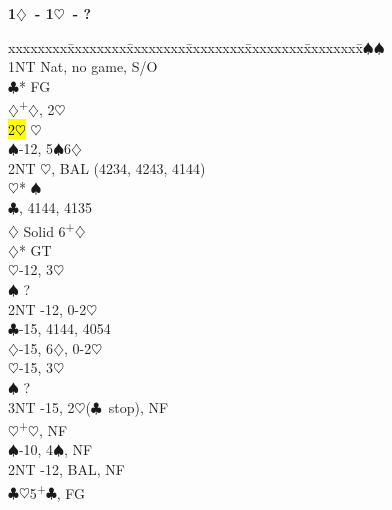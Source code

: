 \documentclass[10pt]{article}
\renewcommand{\c}{$\clubsuit$}
\renewcommand{\d}{$\diamondsuit$}
\newcommand{\h}{$\heartsuit$}
\newcommand{\s}{$\spadesuit$}
\newcommand{\p}{\textsuperscript{+}}
\newcommand{\m}{\textsuperscript{\textminus}}
\newenvironment{bidtable}[1][]
{\textbf{#1}
  \begin{adjustwidth}{1em}{}
    \addvspace{2pt}
    \begin{tabbing}
      xxxxxxxx\=xxxxxxxx\=xxxxxxxx\=xxxxxxxx\=xxxxxxxx\=xxxxxxxx\=\kill}
{\end{tabbing}\end{adjustwidth}\bigskip}%
\begin{document}
\begin{multicols*}{2}
\begin{bidtable}[1\d\ - 1\h\ - ?]
1\s             {}\s                                             \\
                \> 1NT  \> Nat, no game, S/O                       \\
                \c* \> FG                                      \\
                \>      \d      {}\p\d, 2\m\h                \\
                \>      \> \hl{2\h} \h                         \\
                \>      \s      {}-12, 5\s 6\d              \\
                \>      \> 2NT      \h, BAL (4234, 4243, 4144) \\
                \>      \>          \h* {}\s                 \\
                \>      \c      {}, 4144, 4135            \\
                \>      \d      \> Solid 6\p\d                 \\
                \d* \> GT                                      \\
                \>      \h      {}-12, 3\h                  \\
                \>      \s      \> ?                           \\
                \>      \> 2NT     -12, 0-2\h                \\
                \>      \c      {}-15, 4144, 4054           \\
                \>      \d      {}-15, 6\d, 0-2\h           \\
                \>      \h      {}-15, 3\h                  \\
                \>      \s      \> ?                           \\
                \>      \> 3NT      -15, 2\h (\c\ stop), NF   \\
                \h  {}\p\h, NF                               \\
                \s  {}-10, 4\s, NF                           \\
                \> 2NT  -12, BAL, NF                          \\
                \c  {}\h 5\p\c, FG                           \\

\end{bidtable}
\end{multicols*}
\end{document}
